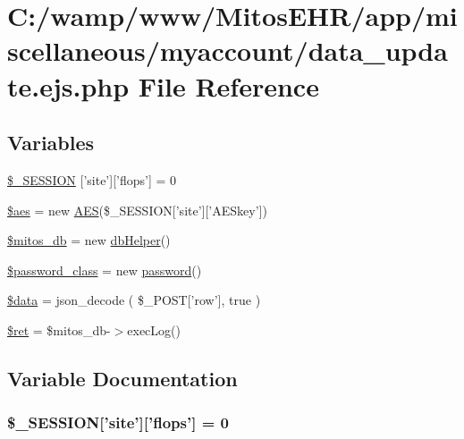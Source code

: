\hypertarget{miscellaneous_2myaccount_2data__update_8ejs_8php}{\section{\-C\-:/wamp/www/\-Mitos\-E\-H\-R/app/miscellaneous/myaccount/data\-\_\-update.ejs.\-php \-File \-Reference}
\label{miscellaneous_2myaccount_2data__update_8ejs_8php}
}
\subsection*{\-Variables}
\begin{DoxyCompactItemize}
\item 
\hyperlink{miscellaneous_2myaccount_2data__update_8ejs_8php_a99fda8552a3e58235643b79f5af3ded8}{\$\-\_\-\-S\-E\-S\-S\-I\-O\-N} \mbox{[}'site'\mbox{]}\mbox{[}'flops'\mbox{]} = 0
\item 
\hyperlink{miscellaneous_2myaccount_2data__update_8ejs_8php_ab30046a94291cd07e400855e9c786ef3}{\$aes} = new \hyperlink{class_a_e_s}{\-A\-E\-S}(\$\-\_\-\-S\-E\-S\-S\-I\-O\-N\mbox{[}'site'\mbox{]}\mbox{[}'\-A\-E\-Skey'\mbox{]})
\item 
\hyperlink{miscellaneous_2myaccount_2data__update_8ejs_8php_ab5d961f93efe4e2e8d8374f01dd6c65a}{\$mitos\-\_\-db} = new \hyperlink{classdb_helper}{db\-Helper}()
\item 
\hyperlink{miscellaneous_2myaccount_2data__update_8ejs_8php_aa79155eb7b0a7b47da49397deef87bb5}{\$password\-\_\-class} = new \hyperlink{classpassword}{password}()
\item 
\hyperlink{miscellaneous_2myaccount_2data__update_8ejs_8php_a6efc15b5a2314dd4b5aaa556a375c6d6}{\$data} = json\-\_\-decode ( \$\-\_\-\-P\-O\-S\-T\mbox{[}'row'\mbox{]}, true )
\item 
\hyperlink{miscellaneous_2myaccount_2data__update_8ejs_8php_affd9e3eb0aad0a7ca42912cd925f148c}{\$ret} = \$mitos\-\_\-db-\/$>$exec\-Log()
\end{DoxyCompactItemize}


\subsection{\-Variable \-Documentation}
\hypertarget{miscellaneous_2myaccount_2data__update_8ejs_8php_a99fda8552a3e58235643b79f5af3ded8}{
\subsubsection[{\$\-\_\-\-S\-E\-S\-S\-I\-O\-N}]{\setlength{\rightskip}{0pt plus 5cm}\$\-\_\-\-S\-E\-S\-S\-I\-O\-N\mbox{[}'site'\mbox{]}\mbox{[}'flops'\mbox{]} = 0}}\label{miscellaneous_2myaccount_2data__update_8ejs_8php_a99fda8552a3e58235643b79f5af3ded8}


